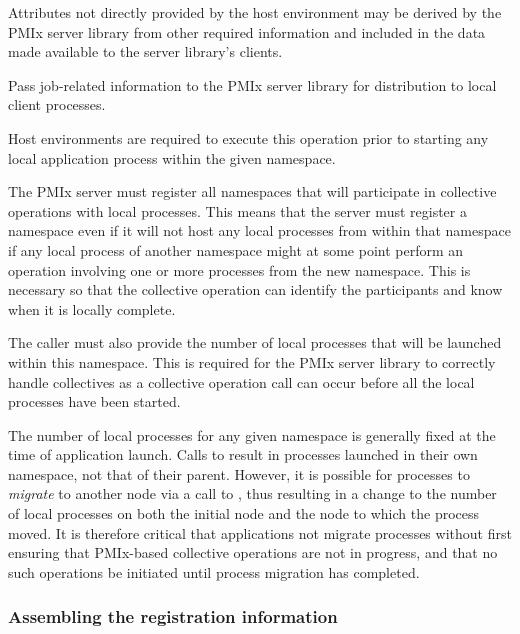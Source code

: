 Attributes not directly provided by the host environment may be derived by the \ac{PMIx} server library from other required information and included in the data made available to the server library's clients.

\optattrend

\descr

Pass job-related information to the \ac{PMIx} server library for distribution to local client processes.

\advicermstart
Host environments are required to execute this operation prior to starting any local application process within the given namespace.

The \ac{PMIx} server must register all namespaces that will participate in collective operations with local processes.
This means that the server must register a namespace even if it will not host any local processes from within that namespace if any local process of another namespace might at some point perform an operation involving one or more processes from the new namespace.
This is necessary so that the collective operation can identify the participants and know when it is locally complete.

The caller must also provide the number of local processes that will be launched within this namespace.
This is required for the \ac{PMIx} server library to correctly handle collectives as a collective operation call can occur before all the local processes have been started.
\advicermend

\adviceuserstart
The number of local processes for any given namespace is generally fixed at the time of application launch. Calls to  result in processes launched in their own namespace, not that of their parent. However, it is possible for processes to \textit{migrate} to another node via a call to , thus resulting in a change to the number of local processes on both the initial node and the node to which the process moved. It is therefore critical that applications not migrate processes without first ensuring that \ac{PMIx}-based collective operations are not in progress, and that no such operations be initiated until process migration has completed.
\adviceuserend


\subsubsection{Assembling the registration information}
\label{chap:api_server:assemble}


